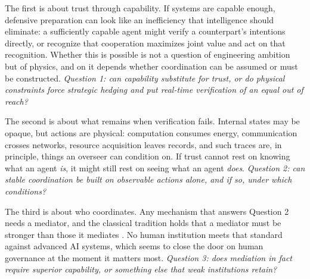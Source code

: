 \documentclass[manuscript,screen,review]{jair}
\begin{document}
The first is about trust through capability. If systems are capable enough, defensive preparation can look like an inefficiency that intelligence should eliminate: a sufficiently capable agent might verify a counterpart's intentions directly, or recognize that cooperation maximizes joint value and act on that recognition. Whether this is possible is not a question of engineering ambition but of physics, and on it depends whether coordination can be assumed or must be constructed. \emph{Question 1: can capability substitute for trust, or do physical constraints force strategic hedging and put real-time verification of an equal out of reach?}

The second is about what remains when verification fails. Internal states may be opaque, but actions are physical: computation consumes energy, communication crosses networks, resource acquisition leaves records, and such traces are, in principle, things an overseer can condition on. If trust cannot rest on knowing what an agent \emph{is}, it might still rest on seeing what an agent \emph{does}. \emph{Question 2: can stable coordination be built on observable actions alone, and if so, under which conditions?}

The third is about who coordinates. Any mechanism that answers Question 2 needs a mediator, and the classical tradition holds that a mediator must be stronger than those it mediates \cite{hobbes.1651}. No human institution meets that standard against advanced AI systems, which seems to close the door on human governance at the moment it matters most. \emph{Question 3: does mediation in fact require superior capability, or something else that weak institutions retain?}
\end{document}
